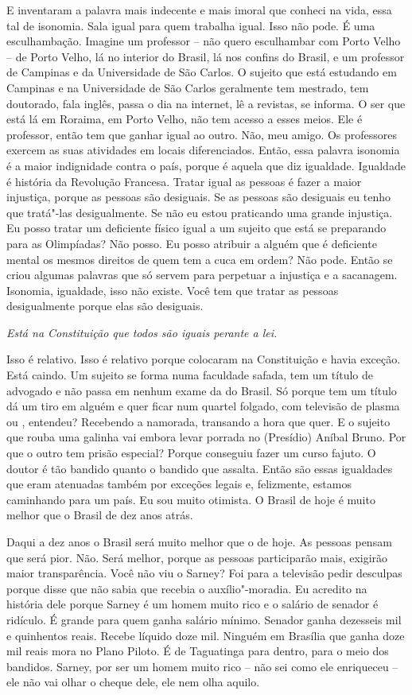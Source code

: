 E inventaram a palavra mais indecente e mais imoral que conheci na vida,
essa tal de isonomia. Sala igual para quem trabalha igual. Isso não
pode. É uma esculhambação. Imagine um professor -- não quero esculhambar
com Porto Velho -- de Porto Velho, lá no interior do Brasil, lá nos
confins do Brasil, e um professor de Campinas e da Universidade de São
Carlos. O sujeito que está estudando em Campinas e na Universidade de
São Carlos geralmente tem mestrado, tem doutorado, fala inglês, passa o
dia na internet, lê a revistas, se informa. O ser que está lá em
Roraima, em Porto Velho, não tem acesso a esses meios. Ele é professor,
então tem que ganhar igual ao outro. Não, meu amigo. Os professores
exercem as suas atividades em locais diferenciados. Então, essa palavra
isonomia é a maior indignidade contra o país, porque é aquela que diz
igualdade. Igualdade é história da Revolução Francesa. Tratar igual as
pessoas é fazer a maior injustiça, porque as pessoas são desiguais. Se
as pessoas são desiguais eu tenho que tratá"-las desigualmente. Se não eu
estou praticando uma grande injustiça. Eu posso tratar um deficiente
físico igual a um sujeito que está se preparando para as Olimpíadas? Não
posso. Eu posso atribuir a alguém que é deficiente mental os mesmos
direitos de quem tem a cuca em ordem? Não pode. Então se criou algumas
palavras que só servem para perpetuar a injustiça e a sacanagem.
Isonomia, igualdade, isso não existe. Você tem que tratar as pessoas
desigualmente porque elas são desiguais.

\medskip

\noindent\emph{Está na Constituição que todos são iguais perante a lei.}

Isso é relativo. Isso é relativo porque colocaram na
Constituição e havia exceção. Está caindo. Um sujeito se forma numa
faculdade safada, tem um título de advogado e não passa em nenhum exame
da  do Brasil. Só porque tem um título dá um tiro em alguém e quer
ficar num quartel folgado, com televisão de plasma ou , entendeu?
Recebendo a namorada, transando a hora que quer. E o sujeito que rouba
uma galinha vai embora levar porrada no (Presídio) Aníbal Bruno. Por que
o outro tem prisão especial? Porque conseguiu fazer um curso fajuto. O
doutor é tão bandido quanto o bandido que assalta. Então são essas
igualdades que eram atenuadas também por exceções legais e, felizmente,
estamos caminhando para um país. Eu sou muito otimista. O Brasil de hoje
é muito melhor que o Brasil de dez anos atrás.

Daqui a dez anos o Brasil será muito melhor que o de hoje. As pessoas
pensam que será pior. Não. Será melhor, porque as pessoas participarão
mais, exigirão maior transparência. Você não viu o Sarney? Foi para a
televisão pedir desculpas porque disse que não sabia que recebia o
auxílio"-moradia. Eu acredito na história dele porque Sarney é um homem
muito rico e o salário de senador é ridículo. É grande para quem ganha
salário mínimo. Senador ganha dezesseis mil e quinhentos reais. Recebe
líquido doze mil. Ninguém em Brasília que ganha doze mil reais mora no
Plano Piloto. É de Taguatinga para dentro, para o meio dos bandidos.
Sarney, por ser um homem muito rico -- não sei como ele enriqueceu --
ele não vai olhar o cheque dele, ele nem olha aquilo.

